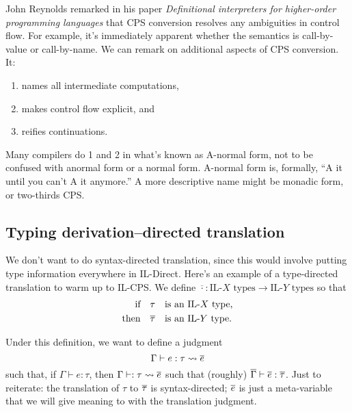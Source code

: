 John Reynolds remarked in his paper \emph{Definitional interpreters for higher-order
programming languages} that CPS conversion resolves any ambiguities in control flow. For example,
it's immediately apparent whether the semantics is call-by-value or call-by-name. We can remark
on additional aspects of CPS conversion. It:
\begin{enumerate}[1.]
  \item names all intermediate computations,
  \item makes control flow explicit, and
  \item reifies continuations.
\end{enumerate}

Many compilers do 1 and 2 in what's known as A-normal form, not to be confused with anormal
form or a normal form. A-normal form is, formally, ``A it until you can't A it anymore.''
A more descriptive name might be monadic form, or two-thirds CPS.

\subsection{Typing derivation--directed translation}
We don't want to do syntax-directed translation, since this would involve putting type
information everywhere in IL-Direct. Here's an example of a type-directed translation
to warm up to IL-CPS.
We define $\overline{\cdot} : \text{IL-$X$ types} \to \text{IL-$Y$ types}$ so that
\begin{align*}
  \text{if}\quad &\tau \quad \text{is an IL-$X$ type,}\\
  \text{then}\quad &\overline{\tau} \quad \text{is an IL-$Y$ type.}
\end{align*}

Under this definition, we want to define a judgment
\[ \Gamma \vdash e : \tau \leadsto \overline{e} \]
such that, if $\Gamma \vdash e : \tau$, then $\Gamma\vdash : \tau \leadsto \overline{e}$ such that
(roughly) $\overline{\Gamma} \vdash \overline{e} : \overline{\tau}$. Just to reiterate: the translation
of $\tau$ to $\overline{\tau}$ is syntax-directed; $\overline{e}$ is just a meta-variable that we will give
meaning to with the translation judgment.

